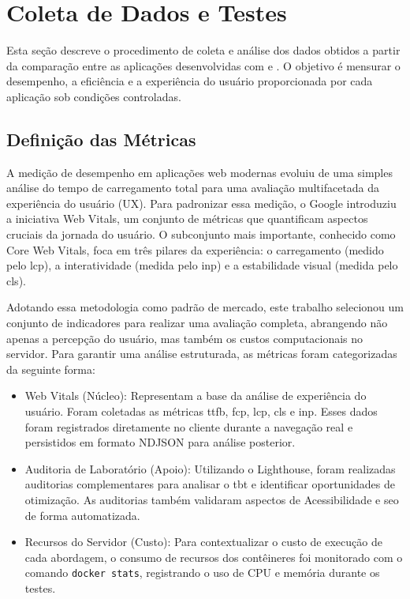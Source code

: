 \section{Coleta de Dados e Testes}
\label{sec:coleta-de-dados-e-testes}

Esta seção descreve o procedimento de coleta e análise dos dados obtidos a partir da comparação entre as aplicações desenvolvidas com  e . O objetivo é mensurar o desempenho, a eficiência e a experiência do usuário proporcionada por cada aplicação sob condições controladas.

\subsection{Definição das Métricas}

A medição de desempenho em aplicações web modernas evoluiu de uma simples análise do tempo de carregamento total para uma avaliação multifacetada da experiência do usuário (UX). Para padronizar essa medição, o Google introduziu a iniciativa Web Vitals, um conjunto de métricas que quantificam aspectos cruciais da jornada do usuário. O subconjunto mais importante, conhecido como Core Web Vitals, foca em três pilares da experiência: o carregamento (medido pelo \acrshort{lcp}), a interatividade (medida pelo \acrshort{inp}) e a estabilidade visual (medida pelo \acrshort{cls}).

Adotando essa metodologia como padrão de mercado, este trabalho selecionou um conjunto de indicadores para realizar uma avaliação completa, abrangendo não apenas a percepção do usuário, mas também os custos computacionais no servidor. Para garantir uma análise estruturada, as métricas foram categorizadas da seguinte forma:

\begin{itemize}
\item Web Vitals (Núcleo): Representam a base da análise de experiência do usuário. Foram coletadas as métricas \acrfull{ttfb}, \acrfull{fcp}, \acrfull{lcp}, \acrfull{cls} e \acrfull{inp}. Esses dados foram registrados diretamente no cliente durante a navegação real e persistidos em formato NDJSON para análise posterior.

\item Auditoria de Laboratório (Apoio): Utilizando o Lighthouse, foram realizadas auditorias complementares para analisar o \acrfull{tbt} e identificar oportunidades de otimização. As auditorias também validaram aspectos de Acessibilidade e \acrshort{seo} de forma automatizada.

\item Recursos do Servidor (Custo): Para contextualizar o custo de execução de cada abordagem, o consumo de recursos dos contêineres foi monitorado com o comando \texttt{docker stats}, registrando o uso de CPU e memória durante os testes.
\end{itemize}



